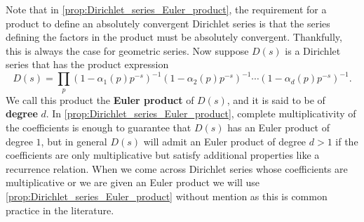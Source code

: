 \documentclass[12pt]{book}
\theoremstyle{definition}\newframedtheorem{method}{Method}
\renewcommand{\a}{\alpha}
\newcommand{\<}{\langle}
\renewcommand{\>}{\rangle}
\begin{document}
      Note that in \cref{prop:Dirichlet_series_Euler_product}, the requirement for a product to define an absolutely convergent Dirichlet series is that the series defining the factors in the product must be absolutely convergent. Thankfully, this is always the case for geometric series. Now suppose $D(s)$ is a Dirichlet series that has the product expression
      \[
        D(s) = \prod_{p}(1-\a_{1}(p)p^{-s})^{-1}(1-\a_{2}(p)p^{-s})^{-1} \cdots (1-\a_{d}(p)p^{-s})^{-1}.
      \]
      We call this product the \textbf{Euler product} of $D(s)$, and it is said to be of \textbf{degree} $d$. In \cref{prop:Dirichlet_series_Euler_product}, complete multiplicativity of the coefficients is enough to guarantee that $D(s)$ has an Euler product of degree $1$, but in general $D(s)$ will admit an Euler product of degree $d > 1$ if the coefficients are only multiplicative but satisfy additional properties like a recurrence relation. When we come across Dirichlet series whose coefficients are multiplicative or we are given an Euler product we will use \cref{prop:Dirichlet_series_Euler_product} without mention as this is common practice in the literature.
\end{document}
